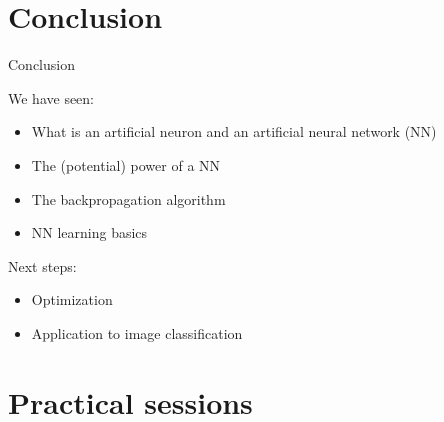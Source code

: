 \documentclass[xcolor=pdftex,dvipsnames,table,mathserif]{beamer}
\begin{document}


\section{Conclusion}


\begin{frame}{Conclusion}

  We have seen:
  \begin{itemize}
  \item What is an artificial neuron and an artificial neural network (NN)
  \item The (potential) power of a NN
  \item The backpropagation algorithm
  \item NN learning basics
  \end{itemize}

  Next steps:
  \begin{itemize}
    \item Optimization
    \item Application to image classification
  \end{itemize}


\end{frame}



\section*{Practical sessions}
\end{document}
